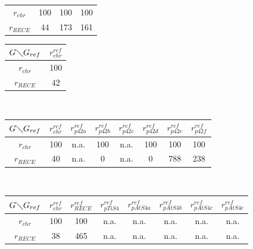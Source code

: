 \begin{table}[H]
\begin{center}
\begin{minipage}[t]{0.45\textwidth}
\begin{tabular}{c|ccc}
			\hline
			$r_{chr}$ & 100 & 100 & 100\\
			$ r_{RECE}$ & 44 & 173 & 161\\
			\end{tabular}
	\end{minipage}
	\begin{minipage}[t]{0.45\textwidth}
	\label{tablesyntbruc4}
	\centering
		\begin{tabular}{c|c}
			$G \diagdown G_{ref}$ & $r^{ref}_{chr}$\\
			\hline
			$r_{chr}$ & 100\\
			$r_{RECE}$ & 42\\
		\end{tabular}
	\end{minipage}
\\
\vspace{0.5cm}
	\begin{minipage}[t]{\textwidth}
	\label{tablesyntbruc5}
	\centering
		\begin{tabular}{c|ccccccc}
			$G \diagdown G_{ref}$ & $r^{ref}_{chr}$ & $r^{ref}_{p42a}$ & $r^{ref}_{p42b}$ & $r^{ref}_{p42c}$ & $r^{ref}_{p42d}$ & $r^{ref}_{p42e}$ & $r^{ref}_{p42f}$\\
			\hline
			$r_{chr}$ & 100 & n.a. & 100 & n.a. & 100 & 100 & 100\\
			$r_{RECE}$ & 40 & n.a. & 0 & n.a. & 0 & 788 & 238\\
		\end{tabular}
	\end{minipage}
\\
\vspace{0.5cm}
	\begin{minipage}[t]{\textwidth}
	\hspace{-1cm}
	\label{tablesyntbruc6}
	\centering
		\begin{tabular}{c|ccccccc}
			$G \diagdown G_{ref}$ & $r^{ref}_{chr}$ & $r^{ref}_{RECE}$ & $r^{ref}_{pTiS4}$ & $r^{ref}_{pAtS4a}$ & $r^{ref}_{pAtS4b}$ & $r^{ref}_{pAtS4c}$ & $r^{ref}_{pAtS4e}$\\
			\hline
			$r_{chr}$ & 100 & 100 & n.a. & n.a. & n.a. & n.a. & n.a.\\
			$r_{RECE}$ & 38 & 465 & n.a. & n.a. & n.a. & n.a. & n.a.\\

\end{tabular}
\end{minipage}
\end{center}
\end{table}
